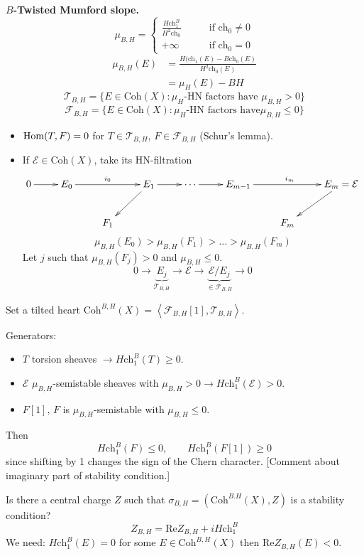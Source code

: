 \medskip\noindent
{\bf $B$-Twisted Mumford slope.}
$$
\mu_{B,H}=
\begin{cases}
\frac{H \text{ch}_1^B}{H^2 \text{ch}_0}\qquad
&\text{if }\text{ch}_0\neq 0 \\
+\infty\qquad &\text{if }\text{ch}_0=0
\end{cases}
$$
$$
\begin{aligned}
\mu_{B,H}(E)&=\frac{H(\text{ch}_1(E)
-B\text{ch}_0(E)}{H^2\text{ch}_0(E)}\\
&=\mu_H(E)-BH
\end{aligned}
$$
$$
\mathcal{T}_{B,H}=\{E \in
\text{Coh}(X):\mu_H\text{-HN factors have }
\mu_{B,H}>0\}
$$
$$
\mathcal{F}_{B,H}=\{E \in \text{Coh}(X):
\mu_H\text{-HN factors have
}\mu_{B,H}\leq 0\}
$$
\begin{itemize}
\item $\mathop{\mathrm{Hom}}\nolimits(T,F)=0$ for $T \in
\mathcal{T}_{B,H}$, $F \in \mathcal{F}_{B,H}$
(Schur's lemma).
\item If $\mathcal{E}\in\text{Coh}(X)$, take
its HN-filtration
$$
\xymatrix{
0\ar[r]&E_0\ar[rr]^{i_0}&&E_1\ar[dl]\ar[r]&
\cdots\ar[r]
&E_{m-1}\ar[rr]^{i_m}&&E_m=\mathcal{E}\ar[dl]
\\
&&F_1& & & & F_m
}
$$
$$
\mu_{B,H}(E_0)>\mu_{B,H}(F_1)>\ldots>\mu_{B,
H}
(F_m)
$$
Let $j$ such that $\mu_{B,H}(F_j)>0$ and
$\mu_{B,H}\leq 0$.
$$
0 \to \underbrace{E_j}_{\mathcal{T}_{B,H}}\to
\mathcal{E}
\to \underbrace{\mathcal{E}/E_j}_{\in
\mathcal{F}_{B,H}}\to 0
$$
\end{itemize}

Set a tilted heart
$\text{Coh}^{B,H}(X)=\left\langle{}\mathcal{F}_{B,H}
[1],
\mathcal{T}_{B,H}\right\rangle{}$.

Generators:
\begin{itemize}
\item $T$ torsion sheaves $\to
H\text{ch}_1^B(T)\geq 0$.
\item $\mathcal{E}$ $\mu_{B,H}$-semistable
sheaves with $\mu_{B,H}>0 \to
H\text{ch}_1^B (\mathcal{E})>0$.
\item $F[1]$,  $F$ is $\mu_{B,H}$-semistable
with $\mu_{B,H}\leq 0$.
\end{itemize}
Then
$$
H\text{ch}_1^B (F)\leq 0,\qquad
H\text{ch}_1^B (F[1])\geq 0
$$
since shifting by 1 changes the sign of the
Chern character. [Comment about imaginary
part of stability condition.]

Is there a central charge $Z$ such that
$\sigma_{B,H}=(\text{Coh}^{B.H}(X),Z)$ is a
stability condition?
$$
Z_{B,H}=\text{Re}Z_{B,H}+i H\text{ch}_1^B
$$
We need: $H\text{ch}_1^B(E)=0$ for some $E
\in \text{Coh}^{B,H}(X)$ then
$\text{Re}Z_{B,H}(E)<0$.

